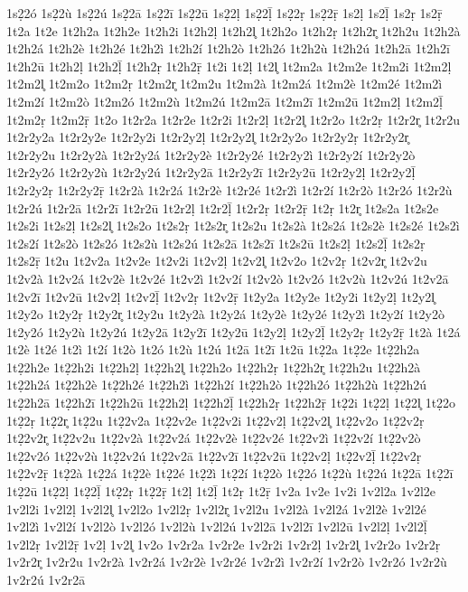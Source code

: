{1s2̣2ó
1s2̣2ù
1s2̣2ú
1s2̣2ā
1s2̣2ī
1s2̣2ū
1s2̣2ḷ
1s2̣2ḹ
1s2̣2ṛ
1s2̣2ṝ
1s2ḷ
1s2ḹ
1s2ṛ
1s2ṝ
1t2a
1t2e
1t2h2a
1t2h2e
1t2h2i
1t2h2ḷ
1t2h2l̥
1t2h2o
1t2h2ṛ
1t2h2r̥
1t2h2u
1t2h2à
1t2h2á
1t2h2è
1t2h2é
1t2h2ì
1t2h2í
1t2h2ò
1t2h2ó
1t2h2ù
1t2h2ú
1t2h2ā
1t2h2ī
1t2h2ū
1t2h2ḷ
1t2h2ḹ
1t2h2ṛ
1t2h2ṝ
1t2i
1t2ḷ
1t2l̥
1t2m2a
1t2m2e
1t2m2i
1t2m2ḷ
1t2m2l̥
1t2m2o
1t2m2ṛ
1t2m2r̥
1t2m2u
1t2m2à
1t2m2á
1t2m2è
1t2m2é
1t2m2ì
1t2m2í
1t2m2ò
1t2m2ó
1t2m2ù
1t2m2ú
1t2m2ā
1t2m2ī
1t2m2ū
1t2m2ḷ
1t2m2ḹ
1t2m2ṛ
1t2m2ṝ
1t2o
1t2r2a
1t2r2e
1t2r2i
1t2r2ḷ
1t2r2l̥
1t2r2o
1t2r2ṛ
1t2r2r̥
1t2r2u
1t2r2y2a
1t2r2y2e
1t2r2y2i
1t2r2y2ḷ
1t2r2y2l̥
1t2r2y2o
1t2r2y2ṛ
1t2r2y2r̥
1t2r2y2u
1t2r2y2à
1t2r2y2á
1t2r2y2è
1t2r2y2é
1t2r2y2ì
1t2r2y2í
1t2r2y2ò
1t2r2y2ó
1t2r2y2ù
1t2r2y2ú
1t2r2y2ā
1t2r2y2ī
1t2r2y2ū
1t2r2y2ḷ
1t2r2y2ḹ
1t2r2y2ṛ
1t2r2y2ṝ
1t2r2à
1t2r2á
1t2r2è
1t2r2é
1t2r2ì
1t2r2í
1t2r2ò
1t2r2ó
1t2r2ù
1t2r2ú
1t2r2ā
1t2r2ī
1t2r2ū
1t2r2ḷ
1t2r2ḹ
1t2r2ṛ
1t2r2ṝ
1t2ṛ
1t2r̥
1t2s2a
1t2s2e
1t2s2i
1t2s2ḷ
1t2s2l̥
1t2s2o
1t2s2ṛ
1t2s2r̥
1t2s2u
1t2s2à
1t2s2á
1t2s2è
1t2s2é
1t2s2ì
1t2s2í
1t2s2ò
1t2s2ó
1t2s2ù
1t2s2ú
1t2s2ā
1t2s2ī
1t2s2ū
1t2s2ḷ
1t2s2ḹ
1t2s2ṛ
1t2s2ṝ
1t2u
1t2v2a
1t2v2e
1t2v2i
1t2v2ḷ
1t2v2l̥
1t2v2o
1t2v2ṛ
1t2v2r̥
1t2v2u
1t2v2à
1t2v2á
1t2v2è
1t2v2é
1t2v2ì
1t2v2í
1t2v2ò
1t2v2ó
1t2v2ù
1t2v2ú
1t2v2ā
1t2v2ī
1t2v2ū
1t2v2ḷ
1t2v2ḹ
1t2v2ṛ
1t2v2ṝ
1t2y2a
1t2y2e
1t2y2i
1t2y2ḷ
1t2y2l̥
1t2y2o
1t2y2ṛ
1t2y2r̥
1t2y2u
1t2y2à
1t2y2á
1t2y2è
1t2y2é
1t2y2ì
1t2y2í
1t2y2ò
1t2y2ó
1t2y2ù
1t2y2ú
1t2y2ā
1t2y2ī
1t2y2ū
1t2y2ḷ
1t2y2ḹ
1t2y2ṛ
1t2y2ṝ
1t2à
1t2á
1t2è
1t2é
1t2ì
1t2í
1t2ò
1t2ó
1t2ù
1t2ú
1t2ā
1t2ī
1t2ū
1t2̣2a
1t2̣2e
1t2̣2h2a
1t2̣2h2e
1t2̣2h2i
1t2̣2h2ḷ
1t2̣2h2l̥
1t2̣2h2o
1t2̣2h2ṛ
1t2̣2h2r̥
1t2̣2h2u
1t2̣2h2à
1t2̣2h2á
1t2̣2h2è
1t2̣2h2é
1t2̣2h2ì
1t2̣2h2í
1t2̣2h2ò
1t2̣2h2ó
1t2̣2h2ù
1t2̣2h2ú
1t2̣2h2ā
1t2̣2h2ī
1t2̣2h2ū
1t2̣2h2ḷ
1t2̣2h2ḹ
1t2̣2h2ṛ
1t2̣2h2ṝ
1t2̣2i
1t2̣2ḷ
1t2̣2l̥
1t2̣2o
1t2̣2ṛ
1t2̣2r̥
1t2̣2u
1t2̣2v2a
1t2̣2v2e
1t2̣2v2i
1t2̣2v2ḷ
1t2̣2v2l̥
1t2̣2v2o
1t2̣2v2ṛ
1t2̣2v2r̥
1t2̣2v2u
1t2̣2v2à
1t2̣2v2á
1t2̣2v2è
1t2̣2v2é
1t2̣2v2ì
1t2̣2v2í
1t2̣2v2ò
1t2̣2v2ó
1t2̣2v2ù
1t2̣2v2ú
1t2̣2v2ā
1t2̣2v2ī
1t2̣2v2ū
1t2̣2v2ḷ
1t2̣2v2ḹ
1t2̣2v2ṛ
1t2̣2v2ṝ
1t2̣2à
1t2̣2á
1t2̣2è
1t2̣2é
1t2̣2ì
1t2̣2í
1t2̣2ò
1t2̣2ó
1t2̣2ù
1t2̣2ú
1t2̣2ā
1t2̣2ī
1t2̣2ū
1t2̣2ḷ
1t2̣2ḹ
1t2̣2ṛ
1t2̣2ṝ
1t2ḷ
1t2ḹ
1t2ṛ
1t2ṝ
1v2a
1v2e
1v2i
1v2l2a
1v2l2e
1v2l2i
1v2l2ḷ
1v2l2l̥
1v2l2o
1v2l2ṛ
1v2l2r̥
1v2l2u
1v2l2à
1v2l2á
1v2l2è
1v2l2é
1v2l2ì
1v2l2í
1v2l2ò
1v2l2ó
1v2l2ù
1v2l2ú
1v2l2ā
1v2l2ī
1v2l2ū
1v2l2ḷ
1v2l2ḹ
1v2l2ṛ
1v2l2ṝ
1v2ḷ
1v2l̥
1v2o
1v2r2a
1v2r2e
1v2r2i
1v2r2ḷ
1v2r2l̥
1v2r2o
1v2r2ṛ
1v2r2r̥
1v2r2u
1v2r2à
1v2r2á
1v2r2è
1v2r2é
1v2r2ì
1v2r2í
1v2r2ò
1v2r2ó
1v2r2ù
1v2r2ú
1v2r2ā
}
